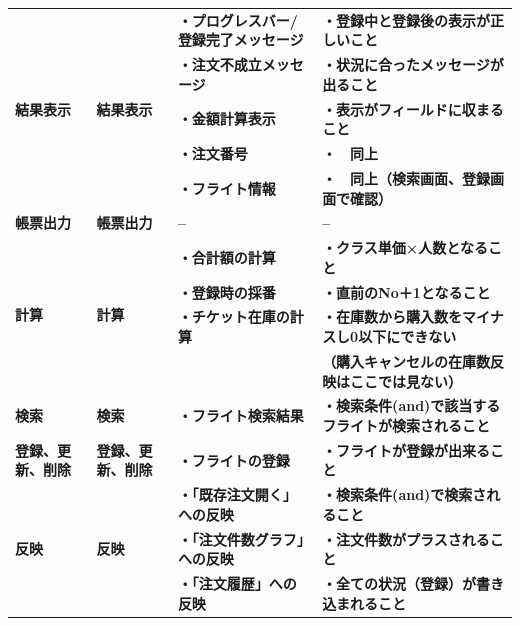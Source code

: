 \begin{table}[htbp]
\begin{tabular}{|l|l|p{13em}|p{18em}|}
    \hline
    \multicolumn{1}{|l|}{\multirow{5}[2]{*}{\textbf{結果表示}}} & \multicolumn{1}{l|}{\multirow{5}[2]{*}{\textbf{結果表示}}} & \textbf{・プログレスバー/登録完了メッセージ} & \textbf{・登録中と登録後の表示が正しいこと} \bigstrut[t]\\
          &       & \textbf{・注文不成立メッセージ} & \textbf{・状況に合ったメッセージが出ること} \\
          &       & \textbf{・金額計算表示} & \textbf{・表示がフィールドに収まること} \\
          &       & \textbf{・注文番号} & \textbf{・　同上} \\
          &       & \textbf{・フライト情報} & \textbf{・　同上（検索画面、登録画面で確認）} \bigstrut[b]\\
    \hline
    \multicolumn{1}{|p{8.665em}|}{\textbf{帳票出力}} & \multicolumn{1}{p{14.085em}|}{\textbf{帳票出力}} & \textbf{--} & \textbf{--} \bigstrut\\
    \hline
    \multicolumn{1}{|l|}{\multirow{4}[2]{*}{\textbf{計算}}} & \multicolumn{1}{l|}{\multirow{4}[2]{*}{\textbf{計算}}} & \textbf{・合計額の計算} & \textbf{・クラス単価×人数となること} \bigstrut[t]\\
          &       & \textbf{・登録時の採番} & \textbf{・直前のNo＋1となること} \\
          &       & \textbf{・チケット在庫の計算} & \textbf{・在庫数から購入数をマイナスし0以下にできない} \\
          &       & \multicolumn{1}{r|}{} & \textbf{（購入キャンセルの在庫数反映はここでは見ない）} \bigstrut[b]\\
    \hline
    \multicolumn{1}{|p{8.665em}|}{\textbf{検索}} & \multicolumn{1}{p{14.085em}|}{\textbf{検索}} & \textbf{・フライト検索結果} & \textbf{・検索条件(and)で該当するフライトが検索されること} \bigstrut\\
    \hline
    \multicolumn{1}{|p{8.665em}|}{\textbf{登録、更新、削除}} & \multicolumn{1}{p{14.085em}|}{\textbf{登録、更新、削除}} & \textbf{・フライトの登録} & \textbf{・フライトが登録が出来ること} \bigstrut\\
    \hline
    \multicolumn{1}{|l|}{\multirow{3}[2]{*}{\textbf{反映}}} & \multicolumn{1}{l|}{\multirow{3}[2]{*}{\textbf{反映}}} & \textbf{・「既存注文開く」への反映} & \textbf{・検索条件(and)で検索されること} \bigstrut[t]\\
          &       & \textbf{・「注文件数グラフ」への反映} & \textbf{・注文件数がプラスされること} \\
          &       & \textbf{・「注文履歴」への反映} & \textbf{・全ての状況（登録）が書き込まれること} \bigstrut[b]\\

\end{tabular}
\end{table}
